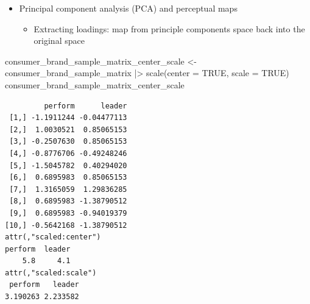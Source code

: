 \documentclass[
  ignorenonframetext,
]{beamer}
\newenvironment{Shaded}{\begin{snugshade}}{\end{snugshade}}
\newcommand{\AttributeTok}[1]{\textcolor[rgb]{0.40,0.45,0.13}{#1}}
\newcommand{\ConstantTok}[1]{\textcolor[rgb]{0.56,0.35,0.01}{#1}}
\newcommand{\FunctionTok}[1]{\textcolor[rgb]{0.28,0.35,0.67}{#1}}
\newcommand{\NormalTok}[1]{\textcolor[rgb]{0.00,0.23,0.31}{#1}}
\newcommand{\OtherTok}[1]{\textcolor[rgb]{0.00,0.23,0.31}{#1}}
\newcommand{\SpecialCharTok}[1]{\textcolor[rgb]{0.37,0.37,0.37}{#1}}
\providecommand{\tightlist}{%
  \setlength{\itemsep}{0pt}\setlength{\parskip}{0pt}}\usepackage{longtable,booktabs,array}
\begin{document}
\begin{frame}[fragile]{}
\label{section-33}
\begin{itemize}
\item
  Principal component analysis (PCA) and perceptual maps

  \begin{itemize}
  \tightlist
  \item
    Extracting loadings: map from principle components space back into
    the original space
  \end{itemize}
\end{itemize}

\tiny

\begin{Shaded}
\begin{Highlighting}[]
\NormalTok{consumer\_brand\_sample\_matrix\_center\_scale }\OtherTok{\textless{}{-}}\NormalTok{ consumer\_brand\_sample\_matrix }\SpecialCharTok{|\textgreater{}} 
  \FunctionTok{scale}\NormalTok{(}\AttributeTok{center =} \ConstantTok{TRUE}\NormalTok{, }\AttributeTok{scale =} \ConstantTok{TRUE}\NormalTok{)}
\NormalTok{consumer\_brand\_sample\_matrix\_center\_scale}
\end{Highlighting}
\end{Shaded}

\begin{verbatim}
         perform      leader
 [1,] -1.1911244 -0.04477113
 [2,]  1.0030521  0.85065153
 [3,] -0.2507630  0.85065153
 [4,] -0.8776706 -0.49248246
 [5,] -1.5045782  0.40294020
 [6,]  0.6895983  0.85065153
 [7,]  1.3165059  1.29836285
 [8,]  0.6895983 -1.38790512
 [9,]  0.6895983 -0.94019379
[10,] -0.5642168 -1.38790512
attr(,"scaled:center")
perform  leader 
    5.8     4.1 
attr(,"scaled:scale")
 perform   leader 
3.190263 2.233582 
\end{verbatim}
\end{frame}
\end{document}
